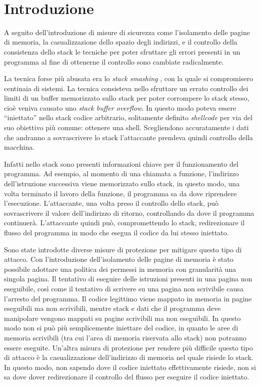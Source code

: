 \thispagestyle{empty}
\
\newpage
\clearpage{\pagestyle{empty}\cleardoublepage}
\mainmatter
\chapter*{Introduzione}


A seguito dell'introduzione di misure di sicurezza come l'isolamento
delle pagine di memoria, la casualizzazione dello spazio degli
indirizzi, e il controllo della consistenza dello stack le tecniche
per poter sfruttare gli errori presenti in un programma al fine di
ottenerne il controllo sono cambiate radicalmente.

La tecnica forse più abusata era lo \emph{stack smashing}
\cite{Phrack-96}, con la quale si compromisero centinaia di
sistemi. La tecnica consisteva nello sfruttare un errato controllo dei
limiti di un buffer memorizzato sullo stack per poter corrompere lo
stack stesso, cioè veniva causato uno \emph{stack buffer overflow}. In
questo modo poteva essere ``iniettato'' nello stack codice arbitrario,
solitamente definito \emph{shellcode} per via del suo obiettivo più
comune: ottenere una shell. Scegliendono accuratamente i dati che
andranno a sovrascrivere lo stack l'attaccante prendeva quindi
controllo della macchina.

Infatti nello stack sono presenti informazioni chiave per il
funzionamento del programma. Ad esempio, al momento di una chiamata a
funzione, l'indirizzo dell'istruzione successiva viene memorizzato
sullo stack, in questo modo, una volta terminato il lavoro della
funzione, il programma sa da dove riprendere
l'esecuzione. L'attaccante, una volta preso il controllo dello stack,
può sovrascrivere il valore dell'indirizzo di ritorno, controllando da
dove il programma continuerà. L'attaccante quindi può, compromettendo
lo stack, redirezionare il flusso del programma in modo che esegua il
codice da lui stesso iniettato.

Sono state introdotte diverse misure di protezione per mitigare questo
tipo di attacco. Con l'introduzione dell'isolamento delle pagine di
memoria è stato possibile adottare una politica dei permessi in
memoria con granularità una singola pagina. Il tentativo di eseguire
delle istruzioni presenti in una pagina non eseguibile, così come il
tentativo di scrivere su una pagina non scrivibile causa l'arresto del
programma. Il codice legittimo viene mappato in memoria in pagine
eseguibili ma non scrivibili, mentre stack e dati che il programma
deve manipolare vengono mappati su pagine scrivibili ma non
eseguibili. In questo modo non si può più semplicemente iniettare del
codice, in quanto le aree di memoria scrivibili (tra cui l'area di
memoria riservata allo stack) non potranno essere eseguite. Un'altra
misura di protezione per rendere più difficile questo tipo di attacco
è la casualizzazione dell'indirizzo di memoria nel quale risiede lo
stack. In questo modo, non sapendo dove il codice iniettato
effettivamente risiede, non si sa dove dover redirezionare il
controllo del flusso per eseguire il codice iniettato.

